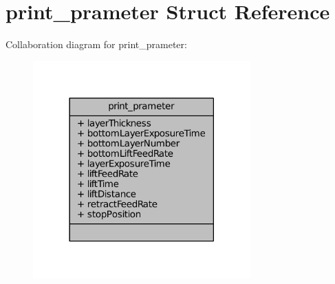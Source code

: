 \hypertarget{structprint__prameter}{}\section{print\+\_\+prameter Struct Reference}
\label{structprint__prameter}


Collaboration diagram for print\+\_\+prameter\+:\nopagebreak
\begin{figure}[H]
\begin{center}
\leavevmode
\includegraphics[width=237pt]{structprint__prameter__coll__graph}
\end{center}
\end{figure}

